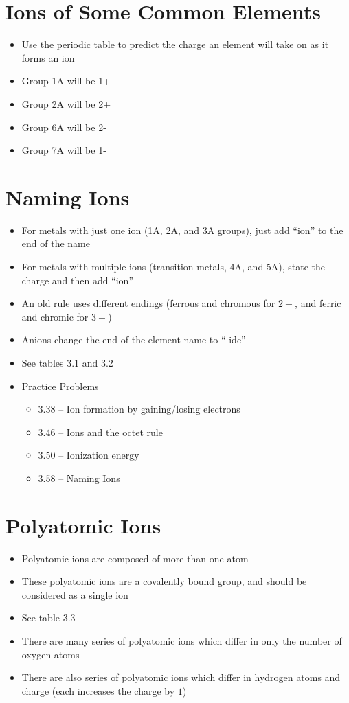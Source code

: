 \documentclass[12pt, openany, letterpaper]{memoir}
\begin{document}
\section{Ions of Some Common Elements}
\begin{itemize}
	\item Use the periodic table to predict the charge an element will take on as it forms an ion
	\item Group 1A will be 1+
	\item Group 2A will be 2+
	\item Group 6A will be 2-
	\item Group 7A will be 1-
\end{itemize}

\section{Naming Ions}
\begin{itemize}
	\item For metals with just one ion (1A, 2A, and 3A groups), just add ``ion'' to the end of the name
	\item For metals with multiple ions (transition metals, 4A, and 5A), state the charge and then add ``ion''
	\item An old rule uses different endings (ferrous and chromous for $2+$, and ferric and chromic for $3+$)
	\item Anions change the end of the element name to ``-ide''
	\item See tables 3.1 and 3.2
	\item Practice Problems
	\begin{itemize}
		\item 3.38 -- Ion formation by gaining/losing electrons
		\item 3.46 -- Ions and the octet rule
		\item 3.50 -- Ionization energy
		\item 3.58 -- Naming Ions
	\end{itemize}
	
\end{itemize}

\section{Polyatomic Ions}
\begin{itemize}
	\item Polyatomic ions are composed of more than one atom
	\item These polyatomic ions are a covalently bound group, and should be considered as a single ion
	\item See table 3.3
	\item There are many series of polyatomic ions which differ in only the number of oxygen atoms
	\item There are also series of polyatomic ions which differ in hydrogen atoms and charge (each  increases the charge by $1$)
\end{itemize}
\end{document}
